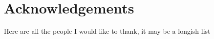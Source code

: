 
\chapter{Acknowledgements}

Here are all the people I would like to thank, it may be a longish list